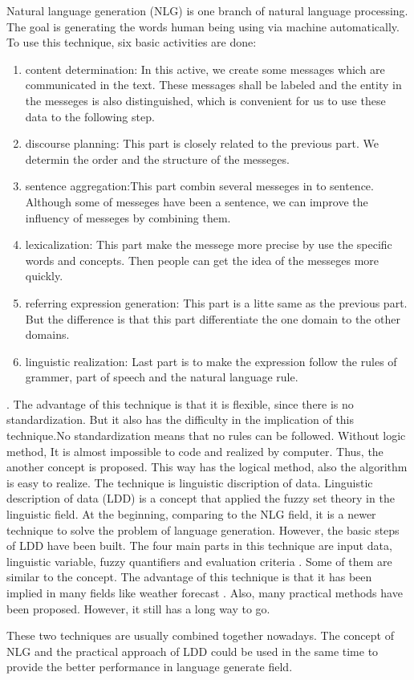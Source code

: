 Natural language generation (NLG) is one branch of natural language processing. 
The goal is generating the words human being using via machine automatically. 
To use this technique, six basic activities are done: 
\begin{enumerate}
	\item content determination: In this active, we create some messages which are communicated in the text. 
	These messages shall be labeled and the entity in the messeges is also distinguished, which is convenient for us to use these data to the following step.
	\item discourse planning: This part is closely related to the previous part. 
	We determin the order and the structure of the messeges.
	\item sentence aggregation:This part combin several messeges in to sentence. 
	Although some of messeges have been a sentence, we can improve the influency of messeges by combining them.
	\item lexicalization: This part make the messege more precise by use the specific words and concepts. 
	Then people can get the idea of the messeges more quickly.
	\item referring expression generation: This part is a litte same as the previous part. 
	But the difference is that this part differentiate the one domain to the other domains.
	\item linguistic realization: Last part is to make the expression follow the rules of grammer, part of speech and the natural language rule.
\end{enumerate}
\cite{aramossoto2016onthe}. The advantage of this technique is that it is flexible, since there is no standardization. 
But it also has the difficulty in the implication of this technique.\cite{aramossoto2016onthe}No standardization means that no rules can be followed. Without logic method, It is almost impossible to code and realized by computer.
Thus, the another concept is proposed. This way has the logical method, also the algorithm is easy to realize.
The technique is linguistic discription of data.
Linguistic description of data (LDD) is a concept that applied the fuzzy set theory in the linguistic field. At the beginning, comparing to the NLG field, it is a newer technique to solve the problem of language generation. 
However, the basic steps of LDD have been built. 
The four main parts in this technique are input data, linguistic variable, fuzzy quantifiers and evaluation criteria \cite{aramossoto2016onthe}. Some of them are similar to the concept. 
The advantage of this technique is that it has been implied in many fields like weather forecast \cite{Ramos-SotoBBT14}. Also, many practical methods have been proposed. However, it still has a long way to go.

These two techniques are usually combined together nowadays. The concept of NLG and the practical approach of LDD could be used in the same time to provide the better performance in language generate field.

\newpage %